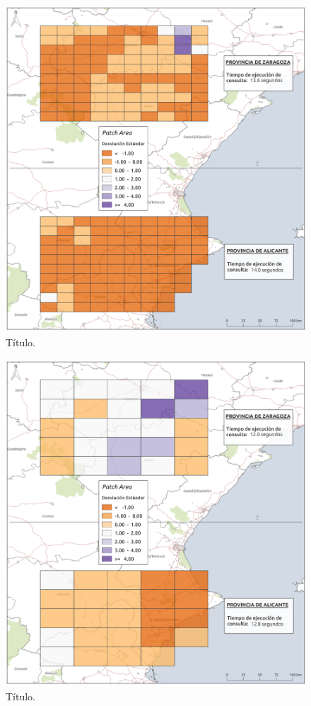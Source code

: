 \begin{figure}
\begin{center}
\includegraphics[width=\textwidth]{ResultadosyDiscusion/Figs/Results/p_50.png}
\caption{Título.}
\end{center}
\end{figure}

\begin{figure}
\begin{center}
\includegraphics[width=\textwidth]{ResultadosyDiscusion/Figs/Results/p_100.png}
\caption{Título.}
\end{center}
\end{figure}

